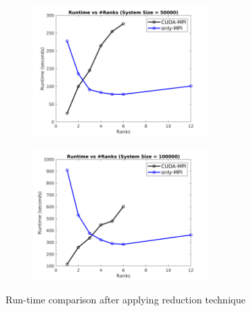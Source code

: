\documentclass[sigplan,screen]{acmart}
\begin{document}
\begin{figure}
	\begin{subfigure}{0.3\textwidth}
		\includegraphics[trim= 10 5 35 10,clip, width=0.95\linewidth, height=5cm]{plots/compare_strong_50k.png} 
		\caption{}
	\end{subfigure}
	\begin{subfigure}{0.3\textwidth}
		\includegraphics[trim= 10 5 35 10,clip, width=0.95\linewidth, height=5cm]{plots/compare_strong_100k.png}
		\caption{}
	\end{subfigure}
	\caption{Run-time comparison after applying reduction technique}
	\label{compare_strong}
\end{figure}
\end{document}
